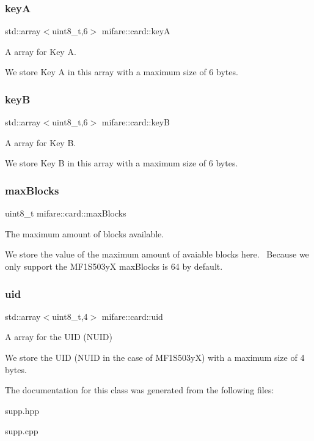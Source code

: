 \subsubsection{\texorpdfstring{keyA}{keyA}}
{\footnotesize\ttfamily std\+::array$<$uint8\+\_\+t,6$>$ mifare\+::card\+::keyA}



A array for Key A. 

We store Key A in this array with a maximum size of 6 bytes. \mbox{\label{classmifare_1_1card_ae99191bf1a9478b61f4b0043c6e0d7bf}} 
\subsubsection{\texorpdfstring{keyB}{keyB}}
{\footnotesize\ttfamily std\+::array$<$uint8\+\_\+t,6$>$ mifare\+::card\+::keyB}



A array for Key B. 

We store Key B in this array with a maximum size of 6 bytes. \mbox{\label{classmifare_1_1card_a3283a205a271075bd6e4b0bea3f015cb}} 
\subsubsection{\texorpdfstring{max\+Blocks}{maxBlocks}}
{\footnotesize\ttfamily uint8\+\_\+t mifare\+::card\+::max\+Blocks}



The maximum amount of blocks available. 

We store the value of the maximum amount of avaiable blocks here.~\newline
Because we only support the M\+F1\+S503yX max\+Blocks is 64 by default. \mbox{\label{classmifare_1_1card_a0f97900bf64b956ac9f9622671aa4f74}} 
\subsubsection{\texorpdfstring{uid}{uid}}
{\footnotesize\ttfamily std\+::array$<$uint8\+\_\+t,4$>$ mifare\+::card\+::uid}



A array for the U\+ID (N\+U\+ID) 

We store the U\+ID (N\+U\+ID in the case of M\+F1\+S503yX) with a maximum size of 4 bytes. 

The documentation for this class was generated from the following files\+:\begin{DoxyCompactItemize}
\item 
supp.\+hpp\item 
supp.\+cpp\end{DoxyCompactItemize}
